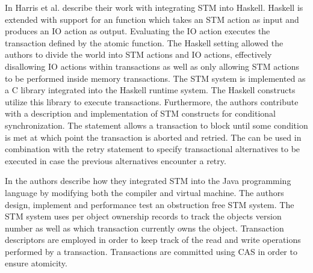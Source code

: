 In \cite{harris2005composable} Harris et al. describe their work with integrating \ac{STM} into Haskell. Haskell is extended with support for an  function which takes an \ac{STM} action as input and produces an \ac{IO} action as output\cite[p. 51]{harris2005composable}. Evaluating the IO action executes the transaction defined by the atomic function. The Haskell setting allowed the authors to divide the world into \ac{STM} actions and \ac{IO} actions\cite[p. 51]{harris2005composable}, effectively disallowing \ac{IO} actions within transactions as well as only allowing \ac{STM} actions to be performed inside memory transactions. The \ac{STM} system is implemented as a C library integrated into the Haskell runtime system. The Haskell constructs utilize this library to execute transactions\cite[p. 56]{harris2005composable}. Furthermore, the authors contribute with a description and implementation of \ac{STM} constructs for conditional synchronization. The  statement allows a transaction to block until some condition is met at which point the transaction is aborted and retried\cite[p. 52]{harris2005composable}. The  can be used in combination with the retry statement to specify transactional alternatives to be executed in case the previous alternatives encounter a retry\cite[p. 52]{harris2005composable}.


In \cite{harris2003language} the authors describe how they integrated \ac{STM} into the Java programming language by modifying both the compiler\cite[p. 4]{harris2003language} and virtual machine\cite[p. 9]{harris2003language}. The authors design, implement and performance test an obstruction free \ac{STM} system. The \ac{STM} system uses per object ownership records to track the objects version number as well as which transaction currently owns the object\cite[p. 6]{harris2003language}. Transaction descriptors are employed in order to keep track of the read and write operations performed by a transaction.
Transactions are committed using \ac{CAS} in order to ensure atomicity\cite[p. 7]{harris2003language}.

\worksheetend